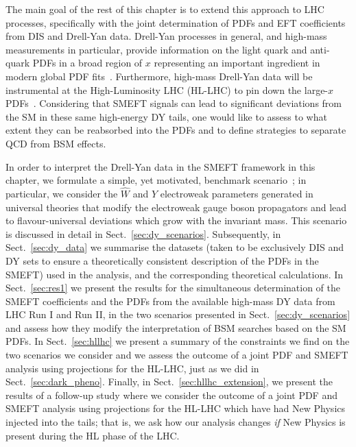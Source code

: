 \documentclass[withindex,glossary]{cam-thesis}
\begin{document}
The main goal of the rest of this chapter is to extend this approach to LHC processes, specifically with the
joint determination of PDFs and EFT coefficients from DIS and Drell-Yan data.
%
Drell-Yan processes in general, and high-mass measurements in particular,
provide information on the light quark and anti-quark PDFs in a broad region of $x$ representing
an important ingredient in modern global PDF fits~\cite{Ball:2014uwa,Ball:2017nwa,Hou:2019efy,Bailey:2020ooq}.
%
Furthermore, high-mass Drell-Yan data will be instrumental at the High-Luminosity LHC (HL-LHC)
to pin down the large-$x$ PDFs~\cite{Khalek:2018mdn}.
%
Considering that SMEFT signals can lead to significant deviations from the SM
in these same high-energy DY tails, one would like to assess to what extent they
can be reabsorbed into the PDFs and to define strategies to
separate QCD from BSM effects.

In order to interpret the Drell-Yan data in the SMEFT framework in this chapter,
we formulate a simple, yet motivated, benchmark scenario~\cite{Farina:2016rws};
in particular, we consider the $\hat{W}$ and $\hat{Y}$ electroweak parameters generated in 
universal theories that modify the electroweak gauge boson propagators 
and lead to flavour-universal deviations which grow with the invariant mass. This scenario is discussed
in detail in Sect.~\ref{sec:dy_scenarios}. Subsequently, in Sect.~\ref{sec:dy_data} we summarise the datasets (taken to be
exclusively DIS and DY sets to ensure a theoretically consistent description of the PDFs
in the SMEFT) used in the 
analysis, and the corresponding theoretical calculations. In Sect.~\ref{sec:res1} we present the 
results for the simultaneous determination of the
SMEFT coefficients and the PDFs from the available high-mass DY data
from LHC Run I and Run II, in the two
scenarios presented in Sect.~\ref{sec:dy_scenarios} and assess how they
modify the interpretation of BSM searches based on the SM PDFs.
%
In Sect.~\ref{sec:hllhc} we present a summary of the constraints we find on the two
scenarios we consider and we assess the outcome of a joint
PDF and SMEFT analysis using projections for the HL-LHC, just as we did
in Sect.~\ref{sec:dark_pheno}.
% 
Finally, in Sect.~\ref{sec:hllhc_extension}, we present the results of a follow-up study
where we consider the outcome of a joint PDF and SMEFT analysis using projections for
the HL-LHC which have had New Physics injected into the tails; that is, we ask how our 
analysis changes \textit{if} New Physics is present during the HL phase of the LHC.
\end{document}

